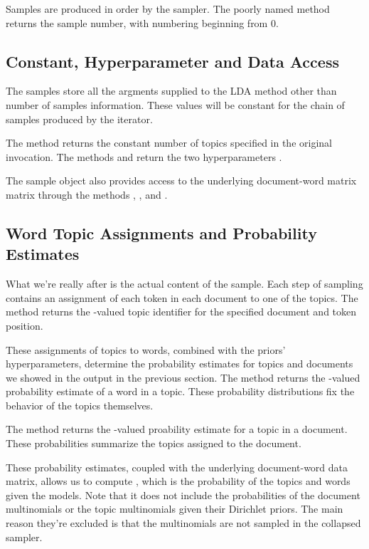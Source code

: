 Samples are produced in order by the sampler.  The poorly named method
 returns the sample number, with numbering beginning
from 0.

\subsection{Constant, Hyperparameter and Data Access}

The samples store all the argments supplied to the LDA method other
than number of samples information.  These values will be constant
for the chain of samples produced by the iterator.

The method  returns the constant number of topics
specified in the original invocation.  The methods
 and  return the two
hyperparameters .

The sample object also provides access to the underlying document-word
matrix matrix through the methods ,
, and .

\subsection{Word Topic Assignments and Probability Estimates}

What we're really after is the actual content of the sample.  Each
step of sampling contains an assignment of each token in each document
to one of the topics.  The method  returns
the -valued topic identifier for the specified document
and token position.

These assignments of topics to words, combined with the priors'
hyperparameters, determine the probability estimates for topics and
documents we showed in the output in the previous section.  The method
 returns the -valued
probability estimate of a word in a topic.  These probability
distributions fix the behavior of the topics themselves.

The method  returns the
-valued proability estimate for a topic in a document.
These probabilities summarize the topics assigned to the document.

These probability estimates, coupled with the underlying document-word
data matrix, allows us to compute ,
which is the probability of the topics and words given the models.
Note that it does not include the probabilities of the document
multinomials or the topic multinomials given their Dirichlet priors.
The main reason they're excluded is that the multinomials are not
sampled in the collapsed sampler.


